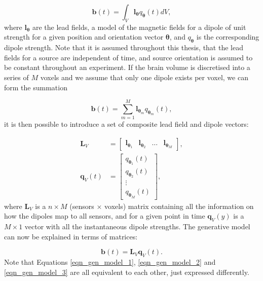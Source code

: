 \begin{equation}
\mathbf{b}(t) = \int_V \mathbf{l}_\mathbf{\theta}q_\mathbf{\theta}(t) dV, \label{eqn_gen_model_1}
\end{equation} where $\mathbf{l}_{\mathbf{\theta}}$ are the lead fields, a model of the magnetic fields for a dipole of unit strength for a given position and orientation vector $\mathbf{\theta}$, and $q_{\mathbf{\theta}}$ is the corresponding dipole strength. Note that it is assumed throughout this thesis, that the lead fields for a source are independent of time, and source orientation is assumed to be constant throughout an experiment. If the brain volume is discretised into a series of $M$ voxels and we assume that only one dipole exists per voxel, we can form the summation

\begin{equation}
\mathbf{b}(t) = \sum_{m=1}^M\mathbf{l}_{\mathbf{\theta}_m}q_{\mathbf{\theta}_m}(t),
\label{eqn_gen_model_2}
\end{equation} it is then possible to introduce a set of composite lead field and dipole vectors:

\begin{equation}
	\begin{aligned}
		\mathbf{L}_V &= 
		\begin{bmatrix} 
			\mathbf{l}_{\mathbf{\theta}_1} & \mathbf{l}_{\mathbf{\theta}_2} & \hdots & \mathbf{l}_{\mathbf{\theta}_M}
		\end{bmatrix},\\
		\mathbf{q}_V(t) &= 
		\begin{bmatrix} 
			q_{\mathbf{\theta}_1}(t) \\ q_{\mathbf{\theta}_2}(t) \\ \vdots \\ q_{\mathbf{\theta}_M}(t)
		\end{bmatrix},
	\end{aligned}	
\end{equation} where $\mathbf{L}_V$ is a $n \times M$ (sensors $\times$ voxels) matrix containing all the information on how the dipoles map to all sensors, and for a given point in time $\mathbf{q}_V(y)$ is a $M\times1$ vector with all the instantaneous dipole strengths. The generative model can now be explained in terms of matrices:

\begin{equation}
\mathbf{b}(t) = \mathbf{L}_V\mathbf{q}_V(t). \label{eqn_gen_model_3}
\end{equation} Note that Equations \ref{eqn_gen_model_1}, \ref{eqn_gen_model_2} and \ref{eqn_gen_model_3} are all equivalent to each other, just expressed differently. 

